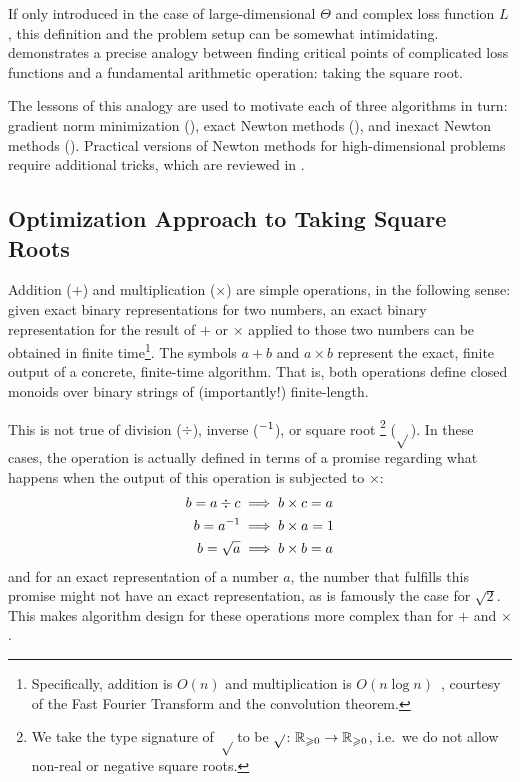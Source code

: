 \documentclass[../../thesis.tex]{subfiles}
\begin{document}
If only introduced in the case of large-dimensional $\Theta$
and complex loss function $L$,
this definition and the problem setup can be somewhat intimidating.
 demonstrates a precise analogy
between finding critical points of complicated loss functions
and a fundamental arithmetic operation: taking the square root.

The lessons of this analogy are used to motivate
each of three algorithms in turn:
gradient norm minimization (),
exact Newton methods (),
and inexact Newton methods ().
Practical versions of Newton methods
for high-dimensional problems
require additional tricks,
which are reviewed in .

\subsection{Optimization Approach to Taking Square Roots}

Addition ($+$) and multiplication ($\times$)
are simple operations, in the following sense:
given exact binary representations for two numbers,
an exact binary representation for the result of $+$ or $\times$
applied to those two numbers can be obtained in finite time\footnote{%
Specifically, addition is $O(n)$ and
multiplication is $O(n\log n)$~\cite{harvey2019},
courtesy of the Fast Fourier Transform and the convolution theorem.}.
The symbols $a + b$ and $a \times b$ represent the exact, finite output
of a concrete, finite-time algorithm.
That is, both operations define closed monoids over
binary strings of
(importantly!) finite-length.

This is not true of division ($\div$), inverse ($^{-1}$), or square root%
\footnote{We take the type signature of $\sqrt$ to be
$\sqrt{}\colon\mathbb{R}_{\geqslant 0}\to\mathbb{R}_{\geqslant 0}$,
i.e.~we do not allow non-real or negative square roots.}
($\sqrt{}$).
In these cases, the operation is actually defined in terms of a promise regarding what happens
when the output of this operation is subjected to $\times$:
\begin{align}
    b = a \div c &\implies b \times c = a\equationlabel{div-promise}\\
    b = a^{-1} &\implies b \times a = 1\equationlabel{inv-promise} \\
    b = \sqrt{a} &\implies b \times b = a\equationlabel{sqrt-promise}
\end{align}
\noindent and for an exact representation of a number $a$,
the number that fulfills this promise might not have an exact representation,
as is famously the case for $\sqrt{2}$.
This makes algorithm design for these operations more complex than for $+$ and $\times$.
\end{document}
